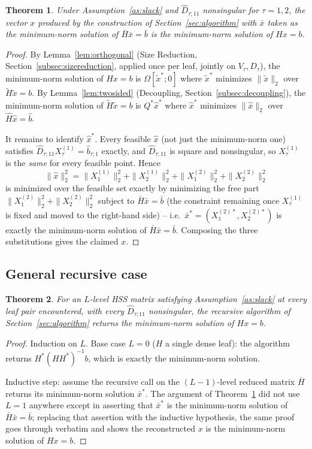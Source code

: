 \documentclass[11pt]{article}
\newtheorem{theorem}{Theorem}
\begin{document}
\begin{theorem}
\label{thm:onelevel}
Under Assumption~\ref{as:slack} and $\hat D_{\tau;11}$ nonsingular for $\tau=1,2$,
the vector $x$ produced by the construction of Section~\ref{sec:algorithm} with
$\bar x$ taken as the minimum-norm solution of $\bar H\bar x=\bar b$ is the
minimum-norm solution of $Hx=b$.
\end{theorem}
\begin{proof}
By Lemma~\ref{lem:orthogonal} (Size Reduction, Section~\ref{subsec:sizereduction},
applied once per leaf, jointly on $V_\tau,D_\tau$), the minimum-norm solution of
$Hx=b$ is $\Omega[\tilde x^*;0]$ where $\tilde x^*$ minimizes $\|\tilde x\|_2$
over $\tilde H\tilde x=b$. By Lemma~\ref{lem:twosided} (Decoupling,
Section~\ref{subsec:decoupling}), the minimum-norm solution of
$\tilde H\tilde x=b$ is $Q^*\hat x^*$ where $\hat x^*$ minimizes $\|\hat x\|_2$
over $\hat H\hat x=\hat b$.

It remains to identify $\hat x^*$. Every feasible $\hat x$ (not just the
minimum-norm one) satisfies $\hat D_{\tau;11}X_\tau^{(1)}=\hat b_{\tau;1}$
exactly, and $\hat D_{\tau;11}$ is square and nonsingular, so $X_\tau^{(1)}$ is
the \emph{same} for every feasible point. Hence
\[
\|\hat x\|_2^2 = \|X_1^{(1)}\|_2^2+\|X_2^{(1)}\|_2^2+\|X_1^{(2)}\|_2^2+\|X_2^{(2)}\|_2^2
\]
is minimized over the feasible set exactly by minimizing the free part
$\|X_1^{(2)}\|_2^2+\|X_2^{(2)}\|_2^2$ subject to $\bar H\bar x=\bar b$ (the
constraint remaining once $X_\tau^{(1)}$ is fixed and moved to the right-hand
side) -- i.e.\ $\bar x^*=(X_1^{(2)*},X_2^{(2)*})$ is exactly the minimum-norm
solution of $\bar H\bar x=\bar b$. Composing the three substitutions gives the
claimed $x$.
\end{proof}

\subsection{General recursive case}

\begin{theorem}
\label{thm:general}
For an $L$-level HSS matrix satisfying Assumption~\ref{as:slack} at every leaf
pair encountered, with every $\hat D_{\tau;11}$ nonsingular, the recursive
algorithm of Section~\ref{sec:algorithm} returns the minimum-norm solution of
$Hx=b$.
\end{theorem}
\begin{proof}
Induction on $L$. Base case $L=0$ ($H$ a single dense leaf): the algorithm
returns $H^*(HH^*)^{-1}b$, which is exactly the minimum-norm solution.

Inductive step: assume the recursive call on the $(L-1)$-level reduced matrix
$\bar H$ returns its minimum-norm solution $\bar x^*$. The argument of
Theorem~\ref{thm:onelevel} did not use $L=1$ anywhere except in asserting that
$\bar x^*$ is the minimum-norm solution of $\bar H\bar x=\bar b$; replacing
that assertion with the inductive hypothesis, the same proof goes through
verbatim and shows the reconstructed $x$ is the minimum-norm solution of
$Hx=b$.
\end{proof}
\end{document}
